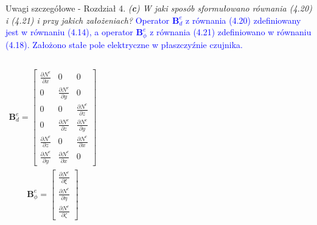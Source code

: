 \documentclass[10pt,aspectratio=169]{beamer} %
\begin{document}
\begin{frame}[label=frame4]{Uwagi szczegółowe - Rozdział 4.}\justifying
\textit{(\textbf{c}) W jaki sposób sformułowano równania (4.20) i (4.21) i przy jakich założeniach?} \textcolor{blue}{Operator \(\textbf{B}_d^e\) z równania (4.20) zdefiniowany jest w równaniu (4.14), a operator \(\textbf{B}_{\phi}^e\) z równania (4.21) zdefiniowano w równaniu (4.18). Założono stałe pole elektryczne w płaszczyźnie czujnika.}
\begin{columns}
\begin{eqnarray*}
\textbf{B}_d^e=\left[\begin{array}{ccc}
\frac{\partial N^e}{\partial x} & 0 & 0\\
0 & \frac{\partial N^e}{\partial y} & 0\\
0 & 0 & \frac{\partial N^e}{\partial z}\\
0 & \frac{\partial N^e}{\partial z} & \frac{\partial N^e}{\partial y}\\
\frac{\partial N^e}{\partial z} & 0 & \frac{\partial N^e}{\partial x}\\
\frac{\partial N^e}{\partial y} & \frac{\partial N^e}{\partial x} & 0
\end{array} \right]
\label{eq:Bd}
\end{eqnarray*}
\begin{eqnarray*}
\textbf{B}_\phi^e =\left[\begin{array}{c}
\frac{\partial N^e}{\partial \xi}\\
\frac{\partial N^e}{\partial \eta}\\
\frac{\partial N^e}{\partial \zeta}
\end{array} \right]
\end{eqnarray*}


\end{columns}
\end{frame}
\end{document}
